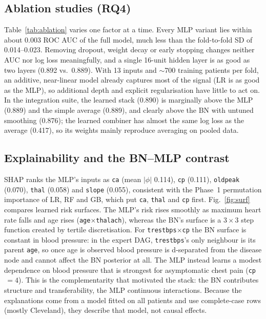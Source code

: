 \documentclass[conference]{IEEEtran}
\newcommand{\code}[1]{\texttt{\small #1}}
\begin{document}
\subsection{Ablation studies (RQ4)}
Table~\ref{tab:ablation} varies one factor at a time. Every MLP variant lies within about 0.003 ROC AUC of the full model, much less than the fold-to-fold SD of 0.014--0.023. Removing dropout, weight decay or early stopping changes neither AUC nor log loss meaningfully, and a single 16-unit hidden layer is as good as two layers (0.892 vs.\ 0.889). With 13 inputs and $\sim$700 training patients per fold, an additive, near-linear model already captures most of the signal (LR is as good as the MLP), so additional depth and explicit regularisation have little to act on. In the integration suite, the learned stack (0.890) is marginally above the MLP (0.889) and the simple average (0.889), and clearly above the BN with untuned smoothing (0.876); the learned combiner has almost the same log loss as the average (0.417), so its weights mainly reproduce averaging on pooled data.

\begin{table}[t]
\caption{Controlled ablations (5-fold CV, fixed settings)}
\label{tab:ablation}
\centering
\scriptsize
\setlength{\tabcolsep}{3pt}

\end{table}

\subsection{Explainability and the BN--MLP contrast}
SHAP ranks the MLP's inputs as \code{ca} (mean $|\phi|$ 0.114), \code{cp} (0.111), \code{oldpeak} (0.070), \code{thal} (0.058) and \code{slope} (0.055), consistent with the Phase~1 permutation importance of LR, RF and GB, which put \code{ca}, \code{thal} and \code{cp} first. Fig.~\ref{fig:surf} compares learned risk surfaces. The MLP's risk rises smoothly as maximum heart rate falls and age rises (\code{age}$\times$\code{thalach}), whereas the BN's surface is a $3\times3$ step function created by tertile discretisation. For \code{trestbps}$\times$\code{cp} the BN surface is constant in blood pressure: in the expert DAG, \code{trestbps}'s only neighbour is its parent \code{age}, so once age is observed blood pressure is d-separated from the disease node and cannot affect the BN posterior at all. The MLP instead learns a modest dependence on blood pressure that is strongest for asymptomatic chest pain (\code{cp}$\,=4$). This is the complementarity that motivated the stack: the BN contributes structure and transferability, the MLP continuous interactions. Because the explanations come from a model fitted on all patients and use complete-case rows (mostly Cleveland), they describe that model, not causal effects.
\end{document}
